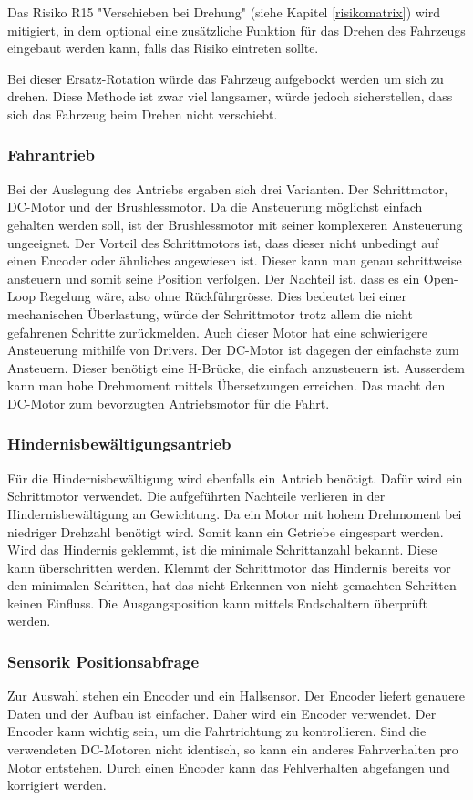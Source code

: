 \documentclass[../main.tex]{subfiles}
\begin{document}
Das Risiko R15 "Verschieben bei Drehung" (siehe Kapitel \ref{risikomatrix}) wird mitigiert,
in dem optional eine zusätzliche Funktion für das Drehen des Fahrzeugs eingebaut werden kann, falls das Risiko eintreten sollte.

Bei dieser Ersatz-Rotation würde das Fahrzeug aufgebockt werden um sich zu drehen.
Diese Methode ist zwar viel langsamer, würde jedoch sicherstellen, dass sich das Fahrzeug 
beim Drehen nicht verschiebt.

\subsubsection{Fahrantrieb}
Bei der Auslegung des Antriebs ergaben sich drei Varianten. Der Schrittmotor, DC-Motor und der Brushlessmotor. Da die Ansteuerung möglichst einfach gehalten werden soll, ist der Brushlessmotor mit seiner komplexeren Ansteuerung ungeeignet. Der Vorteil des Schrittmotors ist, dass dieser nicht unbedingt auf einen Encoder oder ähnliches angewiesen ist. Dieser kann man genau schrittweise ansteuern und somit seine Position verfolgen. Der Nachteil ist, dass es ein Open-Loop Regelung wäre, also ohne Rückführgrösse. Dies bedeutet bei einer mechanischen Überlastung, würde der Schrittmotor trotz allem die nicht gefahrenen Schritte zurückmelden. Auch dieser Motor hat eine schwierigere Ansteuerung mithilfe von Drivers. Der DC-Motor ist dagegen der einfachste zum Ansteuern. Dieser benötigt eine H-Brücke, die einfach anzusteuern ist. Ausserdem kann man hohe Drehmoment mittels Übersetzungen erreichen. Das macht den DC-Motor zum bevorzugten Antriebsmotor für die Fahrt.


\subsubsection{Hindernisbewältigungsantrieb}
Für die Hindernisbewältigung wird ebenfalls ein Antrieb benötigt. Dafür wird ein Schrittmotor verwendet. Die aufgeführten Nachteile verlieren in der Hindernisbewältigung an Gewichtung. Da ein Motor mit hohem Drehmoment bei niedriger Drehzahl benötigt wird. Somit kann ein Getriebe eingespart werden. Wird das Hindernis geklemmt, ist die minimale Schrittanzahl bekannt. Diese kann überschritten werden. Klemmt der Schrittmotor das Hindernis bereits vor den minimalen Schritten, hat das nicht Erkennen von nicht gemachten Schritten keinen Einfluss. Die Ausgangsposition kann mittels Endschaltern überprüft werden.
  

\subsubsection{Sensorik Positionsabfrage}
Zur Auswahl stehen ein Encoder und ein Hallsensor. Der Encoder liefert genauere Daten und der Aufbau ist einfacher. Daher wird ein Encoder verwendet. Der Encoder kann wichtig sein, um die Fahrtrichtung zu kontrollieren. Sind die verwendeten DC-Motoren nicht identisch, so kann ein anderes Fahrverhalten pro Motor entstehen. Durch einen Encoder kann das Fehlverhalten abgefangen und korrigiert werden.
\end{document}
